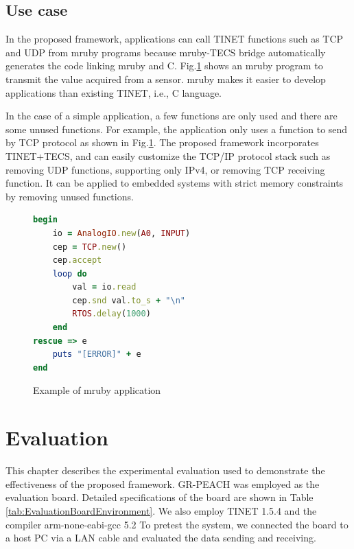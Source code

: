 \documentclass[a4j,12pt,oneside,openany,english]{jsbook}
\begin{document}

\section{Use case}
\label{sec:UseCase}

In the proposed framework, applications can call TINET functions such as TCP and UDP from mruby programs because mruby-TECS bridge automatically generates the code linking mruby and C.
Fig.\ref{src:mruby} shows an mruby program to transmit the value acquired from a sensor.
mruby makes it easier to develop applications than existing TINET, i.e., C language.

In the case of a simple application, a few functions are only used and there are some unused functions.
For example, the application only uses a function to send by TCP protocol as shown in Fig.\ref{src:mruby}.
The proposed framework incorporates TINET+TECS, and can easily customize the TCP/IP protocol stack such as removing UDP functions, supporting only IPv4, or removing TCP receiving function.
It can be applied to embedded systems with strict memory constraints by removing unused functions.


\begin{figure}[t]
\centering
\begin{lstlisting}[language=Ruby]
begin
    io = AnalogIO.new(A0, INPUT)
    cep = TCP.new()	
    cep.accept
    loop do		
        val = io.read  
        cep.snd val.to_s + "\n"		
        RTOS.delay(1000)			
    end
rescue => e	
    puts "[ERROR]" + e
end
\end{lstlisting}
\caption{Example of mruby application}
\label{src:mruby}
\end{figure}


\chapter{Evaluation}
\label{sec:Evaluation}

This chapter describes the experimental evaluation used to demonstrate the effectiveness of the proposed framework.
GR-PEACH was employed as the evaluation board.
Detailed specifications of the board are shown in Table \ref{tab:EvaluationBoardEnvironment}.
We also employ TINET 1.5.4 and the compiler arm-none-eabi-gcc 5.2
To pretest the system, we connected the board to a host PC via a LAN cable and evaluated the data sending and receiving.
\end{document}
